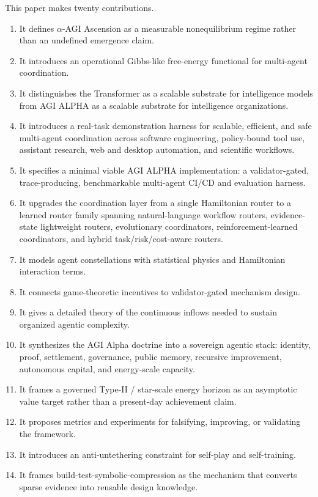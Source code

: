 \documentclass[11pt]{article}
\providecommand{\tightlist}{\setlength{\itemsep}{0pt}\setlength{\parskip}{0pt}}
\begin{document}
This paper makes twenty contributions.

\begin{enumerate}
\def\labelenumi{\arabic{enumi}.}
\tightlist
\item It defines $\alpha$-AGI Ascension as a measurable nonequilibrium regime rather than an undefined emergence claim.
\item It introduces an operational Gibbs-like free-energy functional for multi-agent coordination.
\item It distinguishes the Transformer as a scalable substrate for intelligence models from AGI ALPHA as a scalable substrate for intelligence organizations.
\item It introduces a real-task demonstration harness for scalable, efficient, and safe multi-agent coordination across software engineering, policy-bound tool use, assistant research, web and desktop automation, and scientific workflows.
\item It specifies a minimal viable AGI ALPHA implementation: a validator-gated, trace-producing, benchmarkable multi-agent CI/CD and evaluation harness.
\item It upgrades the coordination layer from a single Hamiltonian router to a learned router family spanning natural-language workflow routers, evidence-state lightweight routers, evolutionary coordinators, reinforcement-learned coordinators, and hybrid task/risk/cost-aware routers.
\item It models agent constellations with statistical physics and Hamiltonian interaction terms.
\item It connects game-theoretic incentives to validator-gated mechanism design.
\item It gives a detailed theory of the continuous inflows needed to sustain organized agentic complexity.
\item It synthesizes the AGI Alpha doctrine into a sovereign agentic stack: identity, proof, settlement, governance, public memory, recursive improvement, autonomous capital, and energy-scale capacity.
\item It frames a governed Type-II / star-scale energy horizon as an asymptotic value target rather than a present-day achievement claim.
\item It proposes metrics and experiments for falsifying, improving, or validating the framework.
\item It introduces an anti-untethering constraint for self-play and self-training.
\item It frames build-test-symbolic-compression as the mechanism that converts sparse evidence into reusable design knowledge.

\end{enumerate}
\end{document}
